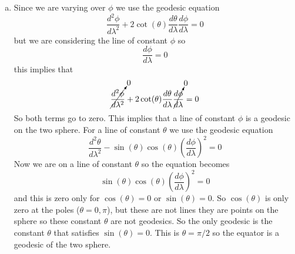 \documentclass[11pt]{article}
\numberwithin{equation}{section}
\begin{document}
\begin{enumerate}[(a)]
\item
Since we are varying over $\phi$ we use the geodesic equation 
$$\frac{d^2\phi}{d\lambda^2} + 2\cot(\theta)\frac{d\theta}{d\lambda}\frac{d\phi}{d\lambda}  = 0$$
but we are considering the line of constant $\phi$ so 
$$\frac{d\phi}{d\lambda} = 0$$
this implies that
$$\cancelto{0}{\frac{d^2\phi}{d\lambda^2}} + 2\cot(\theta)\frac{d\theta}{d\lambda}\cancelto{0}{\frac{d\phi}{d\lambda}}  = 0$$
So both terms go to zero. This implies that a line of constant $\phi$ is a geodesic on the two sphere. For a line of constant $\theta$ we use the geodesic equation
$$\frac{d^2\theta}{d\lambda^2} - \sin(\theta)\cos(\theta)\left(\frac{d\phi}{d\lambda}\right)^2 = 0$$
Now we are on a line of constant $\theta$ so the equation becomes
$$\sin(\theta)\cos(\theta)\left(\frac{d\phi}{d\lambda}\right)^2 = 0$$
and this is zero only for $\cos(\theta) = 0$ or $\sin(\theta) = 0$. So $\cos(\theta)$ is only zero at the poles ($\theta=0,\pi$), but these are not lines they are points on the sphere so these constant $\theta$ are not geodesics. So the only geodesic is the constant $\theta$ that satisfies $\sin(\theta) = 0$. This is $\theta=\pi/2$ so the equator is a geodesic of the two sphere.


\end{enumerate}
\end{document}
